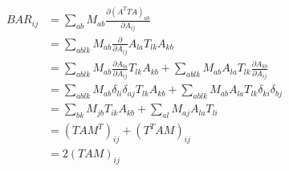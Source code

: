 \documentclass{article}
\begin{document}
\begin{align*}
BAR_{ij} &= \sum_{ab} M_{ab} \frac{\partial  (A^T T A)_{ab} }{\partial A_{ij}} \\
         &= \sum_{ablk} M_{ab} \frac{\partial}{\partial A_{ij}} A_{la} T_{lk} A_{kb} \\
         &= \sum_{ablk} M_{ab} \frac{\partial A_{la}}{\partial A_{ij}} T_{lk} A_{kb} +  \sum_{ablk} M_{ab}A_{la} T_{lk}  \frac{\partial  A_{kb}}{\partial A_{ij}} \\
         &= \sum_{ablk} M_{ab} \delta_{li} \delta_{aj} T_{lk} A_{kb} +  \sum_{ablk} M_{ab}A_{la} T_{lk}  \delta_{ki} \delta_{bj} \\
         &= \sum_{bk} M_{jb} T_{ik} A_{kb}                           +  \sum_{al} M_{aj}A_{la} T_{li}  \\
         &= (T A M^T)_{ij}                                           + (T^T AM)_{ij} \\
         &= 2 (T A M)_{ij}
\end{align*}



% 
%
\end{document}
